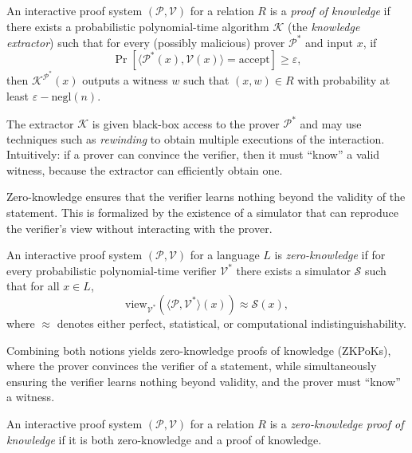 \begin{definition}
An interactive proof system $(\mathcal{P},\mathcal{V})$ for a relation $R$ is a 
\emph{proof of knowledge} if there exists a probabilistic polynomial-time algorithm 
$\mathcal{K}$ (the \emph{knowledge extractor}) such that for every (possibly malicious) prover 
$\mathcal{P}^*$ and input $x$, if
\[
\Pr[\langle \mathcal{P}^*(x), \mathcal{V}(x)\rangle = \text{accept}] \geq \varepsilon,
\]
then $\mathcal{K}^{\mathcal{P}^*}(x)$ outputs a witness $w$ such that $(x,w)\in R$
with probability at least $\varepsilon - \text{negl}(n)$.
\end{definition}

\begin{remark}
The extractor $\mathcal{K}$ is given black-box access to the prover $\mathcal{P}^*$ and may use
techniques such as \emph{rewinding} to obtain multiple executions of the interaction.
Intuitively: if a prover can convince the verifier, then it must ``know'' a valid witness,
because the extractor can efficiently obtain one.
\end{remark}

\myspace

\noindent Zero-knowledge ensures that the verifier learns nothing beyond the validity of the statement.
This is formalized by the existence of a simulator that can reproduce the verifier's view
without interacting with the prover.

\begin{definition}
An interactive proof system $(\mathcal{P},\mathcal{V})$ for a language $L$ is
\emph{zero-knowledge} if for every probabilistic polynomial-time verifier
$\mathcal{V}^*$ there exists a simulator $\mathcal{S}$ such that for all $x \in L$,
\[
\mathrm{view}_{\mathcal{V}^*}(\langle \mathcal{P},\mathcal{V}^*\rangle(x))
\approx \mathcal{S}(x),
\]
where $\approx$ denotes either perfect, statistical, or computational indistinguishability.
\end{definition}

\myspace

\noindent Combining both notions yields zero-knowledge proofs of knowledge (ZKPoKs), where the prover
convinces the verifier of a statement, while simultaneously ensuring the verifier learns nothing
beyond validity, and the prover must ``know'' a witness.

\begin{definition}
An interactive proof system $(\mathcal{P},\mathcal{V})$ for a relation $R$ is a 
\emph{zero-knowledge proof of knowledge} if it is both zero-knowledge and a proof of knowledge.
\end{definition}

